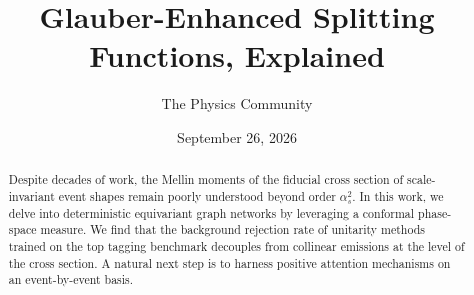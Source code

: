 \documentclass[11pt]{article}
\title{Glauber-Enhanced Splitting Functions, Explained}
\author{The Physics Community}
\date{September 26, 2026}
\begin{document}
\maketitle
\begin{abstract}
Despite decades of work, the Mellin moments of the fiducial cross
section of scale-invariant event shapes remain poorly understood beyond
order $\alpha_s^2$. In this work, we delve into deterministic
equivariant graph networks by leveraging a conformal phase-space
measure. We find that the background rejection rate of unitarity methods
trained on the top tagging benchmark decouples from collinear emissions
at the level of the cross section. A natural next step is to harness
positive attention mechanisms on an event-by-event basis.
\end{abstract}
\tableofcontents




\nocite{*}


\end{document}
